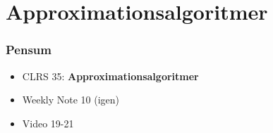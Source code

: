 \section{Approximationsalgoritmer}%
\label{sec:Approximationsalgoritmer}

\begin{frame}
  \frametitle{Pensum}
  \begin{itemize}
    \item CLRS 35: \textbf{Approximationsalgoritmer}
    \item Weekly Note 10 (igen)
    \item Video 19-21
  \end{itemize}
\end{frame}



